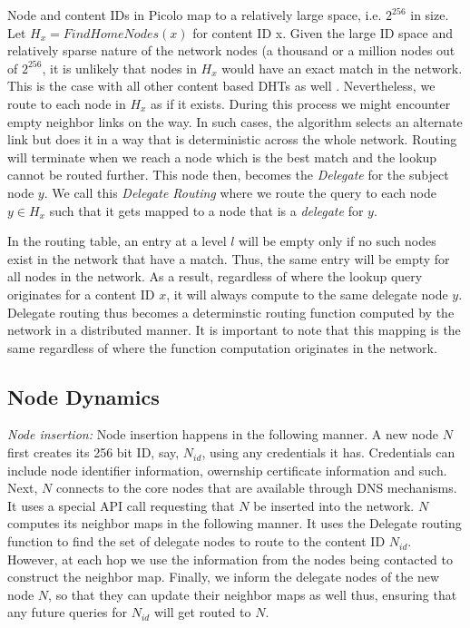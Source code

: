 Node and content IDs in Picolo map to a relatively large space, i.e. \(2^{256}\) in size. Let \( H_x =
FindHomeNodes(x)\) for content ID x. Given the large ID space and relatively sparse nature of the network nodes (a
thousand or a million nodes out of \(2^{256}\), it is unlikely that nodes in \(H_x\) would have an exact match in the
network. This is the case with all other content based DHTs as well \cite{Stoica_2001, Rowstron_2001, tapestry2004}.
Nevertheless, we route to each node in \(H_x\) as if it exists. During this process we might encounter empty neighbor
links on the way. In such cases, the algorithm selects an alternate link but does it in a way that is deterministic
across the whole network. Routing will terminate when we reach a node which is the best match and the lookup cannot be
routed further. This node then, becomes the {\em Delegate} for the subject node \(y\). We call this {\em Delegate
Routing} where we route the query to each node \(y \in H_x \) such that it gets mapped to a node that is a {\em
delegate} for \(y\).

In the routing table, an entry at a level \(l\) will be empty only if no such nodes exist in the network that have a
match. Thus, the same entry will be empty for all nodes in the network. As a result, regardless of where the lookup
query originates for a content ID \(x\), it will always compute to the same delegate node \(y\). Delegate routing thus
becomes a determinstic routing function computed by the network in a distributed manner. It is important to note that
this mapping is the same regardless of where the function computation originates in the network.

\subsection{Node Dynamics}
\label{net:node_dynamics}

{\em Node insertion:} Node insertion happens in the following manner. A new node \(N\) first creates its 256 bit ID,
say, \(N_{id}\), using any credentials it has. Credentials can include node identifier information, owernship certificate information and
such. Next, \( N \) connects to the core nodes that are available through DNS mechanisms. It uses a special API call
requesting that \(N\) be inserted into the network. \(N\) computes its neighbor maps in the following manner. It uses
the Delegate routing function to find the set of delegate nodes to route to the content ID \(N_{id}\). However, at each
hop we use the information from the nodes being contacted to construct the neighbor map. Finally, we inform the delegate
nodes of the new node \(N\), so that they can update their neighbor maps as well thus, ensuring that any future queries
for \(N_{id}\) will get routed to \(N\). 

